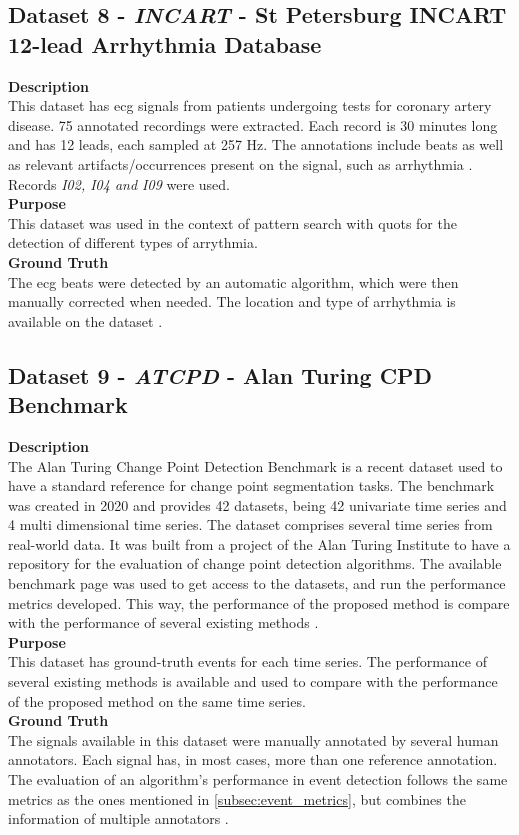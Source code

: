 \subsection{Dataset 8 - \textit{INCART} - St Petersburg INCART 12-lead Arrhythmia Database}
\label{dat:dataset9}
\textbf{Description}\hfill \\
This dataset has \gls{ecg} signals from patients undergoing tests for coronary artery disease. 75 annotated recordings were extracted. Each record is 30 minutes long and has 12 leads, each sampled at 257 Hz. The annotations include beats as well as relevant artifacts/occurrences present on the signal, such as arrhythmia \cite{PhysioNet}. Records \textit{I02, I04 and I09} were used.\\
\textbf{Purpose}\hfill \\
This dataset was used in the context of pattern search with \gls{quots} for the detection of different types of arrythmia.\\
\textbf{Ground Truth}\\
The \gls{ecg} beats were detected by an automatic algorithm, which were then manually corrected when needed. The location and type of arrhythmia is available on the dataset \cite{ecg_arrhythmia}.

\subsection{Dataset 9 - \textit{ATCPD} - Alan Turing CPD Benchmark}
\label{dat:dataset10}
\textbf{Description}\hfill \\
The Alan Turing Change Point Detection Benchmark is a recent dataset used to have a standard reference for change point segmentation tasks. The benchmark was created in 2020 and provides 42 datasets, being 42 univariate time series and 4 multi dimensional time series. The dataset comprises several time series from real-world data. It was built from a project of the Alan Turing Institute to have a repository for the evaluation of change point detection algorithms. The available benchmark page was used to get access to the datasets, and run the performance metrics developed. This way, the performance of the proposed method is compare with the performance of several existing methods \cite{cpd_alan}.\\
\textbf{Purpose}\hfill \\
This dataset has ground-truth events for each time series. The performance of several existing methods is available and used to compare with the performance of the proposed method on the same time series.\\
\textbf{Ground Truth}\\
The signals available in this dataset were manually annotated by several human annotators. Each signal has, in most cases, more than one reference annotation. The evaluation of an algorithm's performance in event detection follows the same metrics as the ones mentioned in \ref{subsec:event_metrics}, but combines the information of multiple annotators \cite{cpd_alan}.

